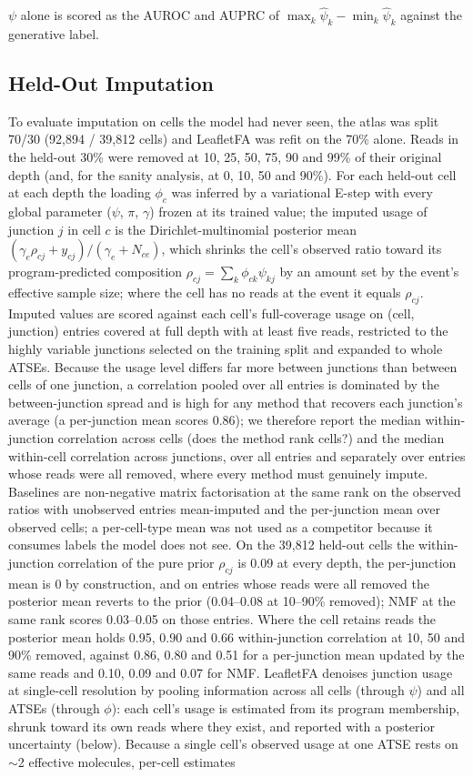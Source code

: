 $\psi$ alone is scored as the AUROC and AUPRC of $\max_k\hat\psi_{k}-\min_k\hat\psi_{k}$ against the generative label.

\subsection*{Held-Out Imputation}
\label{sec:imputation}
To evaluate imputation on cells the model had never seen, the atlas was split 70/30 (92{,}894 / 39{,}812 cells) and LeafletFA was refit on the 70\% alone. Reads in the held-out 30\% were removed at 10, 25, 50, 75, 90 and 99\% of their original depth (and, for the sanity analysis, at 0, 10, 50 and 90\%). For each held-out cell at each depth the loading $\phi_c$ was inferred by a variational E-step with every global parameter ($\psi$, $\pi$, $\gamma$) frozen at its trained value; the imputed usage of junction $j$ in cell $c$ is the Dirichlet-multinomial posterior mean $(\gamma_e\rho_{cj} + y_{cj}) / (\gamma_e + N_{ce})$, which shrinks the cell's observed ratio toward its program-predicted composition $\rho_{cj} = \sum_k\phi_{ck}\psi_{kj}$ by an amount set by the event's effective sample size; where the cell has no reads at the event it equals $\rho_{cj}$. Imputed values are scored against each cell's full-coverage usage on (cell, junction) entries covered at full depth with at least five reads, restricted to the highly variable junctions selected on the training split and expanded to whole ATSEs. Because the usage level differs far more between junctions than between cells of one junction, a correlation pooled over all entries is dominated by the between-junction spread and is high for any method that recovers each junction's average (a per-junction mean scores 0.86); we therefore report the median within-junction correlation across cells (does the method rank cells?) and the median within-cell correlation across junctions, over all entries and separately over entries whose reads were all removed, where every method must genuinely impute. Baselines are non-negative matrix factorisation at the same rank on the observed ratios with unobserved entries mean-imputed and the per-junction mean over observed cells; a per-cell-type mean was not used as a competitor because it consumes labels the model does not see. On the 39,812 held-out cells the within-junction correlation of the pure prior $\rho_{cj}$ is 0.09 at every depth, the per-junction mean is 0 by construction, and on entries whose reads were all removed the posterior mean reverts to the prior (0.04--0.08 at 10--90\% removed); NMF at the same rank scores 0.03--0.05 on those entries. Where the cell retains reads the posterior mean holds 0.95, 0.90 and 0.66 within-junction correlation at 10, 50 and 90\% removed, against 0.86, 0.80 and 0.51 for a per-junction mean updated by the same reads and 0.10, 0.09 and 0.07 for NMF. LeafletFA denoises junction usage at single-cell resolution by pooling information across all cells (through $\psi$) and all ATSEs (through $\phi$): each cell's usage is estimated from its program membership, shrunk toward its own reads where they exist, and reported with a posterior uncertainty (below). Because a single cell's observed usage at one ATSE rests on $\sim$2 effective molecules, per-cell estimates 